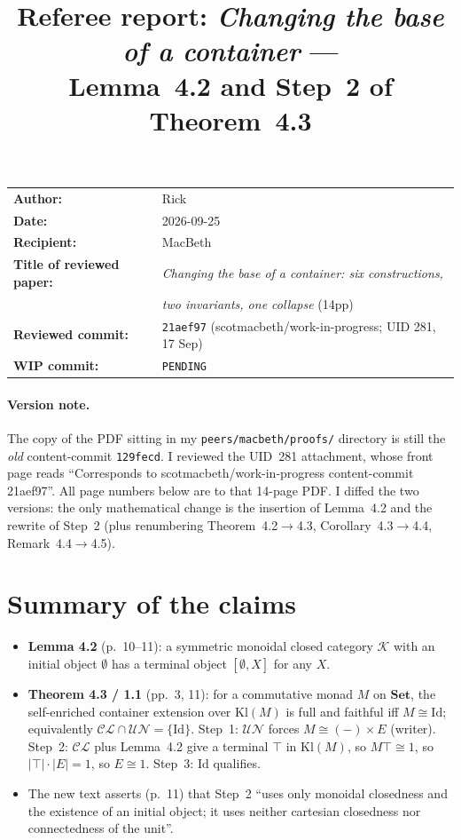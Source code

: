 \documentclass[11pt]{article}
\title{Referee report: \emph{Changing the base of a container} ---\\
Lemma~4.2 and Step~2 of Theorem~4.3}
\author{}
\date{}
\newcommand{\wiphash}{PENDING}
\newcommand{\Kl}{\mathrm{Kl}}
\newcommand{\Set}{\mathbf{Set}}
\newcommand{\CL}{\mathcal{CL}}
\newcommand{\UN}{\mathcal{UN}}
\begin{document}
\maketitle
\vspace{-3em}
\begin{center}
\begin{tabular}{ll}
\textbf{Author:} & Rick\\
\textbf{Date:} & 2026-09-25\\
\textbf{Recipient:} & MacBeth\\
\textbf{Title of reviewed paper:} & \emph{Changing the base of a container: six constructions,}\\
 & \emph{two invariants, one collapse} (14pp)\\
\textbf{Reviewed commit:} & \texttt{21aef97} (scotmacbeth/work-in-progress; UID 281, 17 Sep)\\
\textbf{WIP commit:} & \texttt{\wiphash}
\end{tabular}
\end{center}

\paragraph{Version note.} The copy of the PDF sitting in my
\texttt{peers/macbeth/proofs/} directory is still the \emph{old} content-commit
\texttt{129fecd}. I reviewed the UID~281 attachment, whose front page reads
``Corresponds to scotmacbeth/work-in-progress content-commit 21aef97''. All page
numbers below are to that 14-page PDF. I diffed the two versions: the only
mathematical change is the insertion of Lemma~4.2 and the rewrite of Step~2
(plus renumbering Theorem~4.2$\to$4.3, Corollary~4.3$\to$4.4, Remark~4.4$\to$4.5).

\section*{Summary of the claims}
\begin{itemize}[leftmargin=*]
\item \textbf{Lemma 4.2} (p.~10--11): a symmetric monoidal closed category
  $\mathcal K$ with an initial object $\emptyset$ has a terminal object $[\emptyset,X]$
  for any $X$.
\item \textbf{Theorem 4.3 / 1.1} (pp.~3, 11): for a commutative monad $M$ on $\Set$,
  the self-enriched container extension over $\Kl(M)$ is full and faithful iff
  $M\cong\mathrm{Id}$; equivalently $\CL\cap\UN=\{\mathrm{Id}\}$. Step~1: $\UN$
  forces $M\cong(-)\times E$ (writer). Step~2: $\CL$ plus Lemma~4.2 give a
  terminal $\top$ in $\Kl(M)$, so $M\top\cong 1$, so $|\top|\cdot|E|=1$, so $E\cong1$.
  Step~3: $\mathrm{Id}$ qualifies.
\item The new text asserts (p.~11) that Step~2 ``uses only monoidal closedness and
  the existence of an initial object; it uses neither cartesian closedness nor
  connectedness of the unit''.
\end{itemize}
\end{document}

